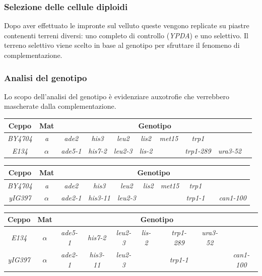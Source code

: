 		\subsubsection*{Selezione delle cellule diploidi}
		Dopo aver effettuato le impronte sul velluto queste vengono replicate su piastre contenenti terreni diversi: uno completo di controllo (\emph{YPDA}) e uno selettivo. 
		Il terreno selettivo viene scelto in base al genotipo per sfruttare il fenomeno di complementazione.

		\subsubsection*{Analisi del genotipo}
		Lo scopo dell'analisi del genotipo \`e evidenziare auxotrofie che verrebbero mascherate dalla complementazione.
		\begin{center}
			\begin{tabular}{|c|c|c|c|c|c|c|c|c|c|}
				\hline
				Ceppo & Mat & \multicolumn{8}{c|}{Genotipo}\\
				\hline
				\emph{BY4704} & \emph{a} & \emph{ade2} & \emph{his3} & \emph{leu2} & \emph{lis2} & \emph{met15} & \emph{trp1} & & \\
				\hline
				\emph{E134} & $\alpha$ & \emph{ade5-1} & \emph{his7-2} & \emph{leu2-3} & \emph{lis-2} & & \emph{trp1-289} & \emph{ura3-52} & \\
				\hline
			\end{tabular}
		\end{center}
		\begin{center}
			\begin{tabular}{|c|c|c|c|c|c|c|c|c|c|}
				\hline
				Ceppo & Mat & \multicolumn{8}{c|}{Genotipo}\\
				\hline
				\emph{BY4704} & \emph{a} & \emph{ade2} & \emph{his3} & \emph{leu2} & \emph{lis2} & \emph{met15} & \emph{trp1} & & \\
				\hline
				\emph{yIG397} & $\alpha$ & \emph{ade2-1} & \emph{his3-11} & \emph{leu2-3} & & & \emph{trp1-1} & & \emph{can1-100}\\
				\hline
			\end{tabular}
		\end{center}
		\begin{center}
			\begin{tabular}{|c|c|c|c|c|c|c|c|c|c|}
				\hline
				Ceppo & Mat & \multicolumn{8}{c|}{Genotipo}\\
				\hline
				\emph{E134} & $\alpha$ & \emph{ade5-1} & \emph{his7-2} & \emph{leu2-3} & \emph{lis-2} & & \emph{trp1-289} & \emph{ura3-52} & \\
				\hline
				\emph{yIG397} & $\alpha$ & \emph{ade2-1} & \emph{his3-11} & \emph{leu2-3} & & & \emph{trp1-1} & & \emph{can1-100}\\
				\hline
			\end{tabular}
		\end{center}


